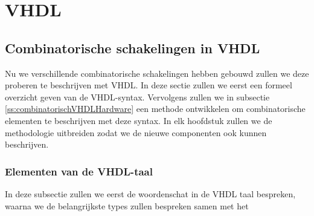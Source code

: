 \chapter{VHDL}
\section{Combinatorische schakelingen in VHDL}
\label{s:combinatorischVHDL}
Nu we verschillende combinatorische schakelingen hebben gebouwd zullen we deze proberen te beschrijven met VHDL. In deze sectie zullen we eerst een formeel overzicht geven van de VHDL-syntax. Vervolgens zullen we in subsectie \ref{ss:combinatorischVHDLHardware} een methode ontwikkelen om combinatorische elementen te beschrijven met deze syntax. In elk hoofdstuk zullen we de methodologie uitbreiden zodat we de nieuwe componenten ook kunnen beschrijven.
\subsection{Elementen van de VHDL-taal}
In deze subsectie zullen we eerst de woordenschat in de VHDL taal bespreken, waarna we de belangrijkste types zullen bespreken samen met het 
